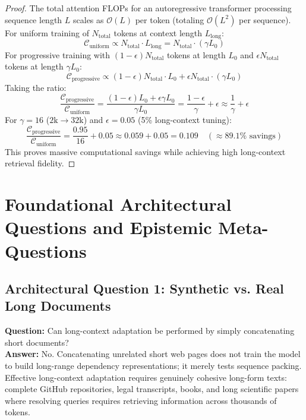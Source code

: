 \documentclass[11pt,a4paper]{article}
\theoremstyle{definition}
\begin{document}
\begin{proof}
The total attention FLOPs for an autoregressive transformer processing sequence length $L$ scales as $\mathcal{O}(L)$ per token (totaling $\mathcal{O}(L^2)$ per sequence).
For uniform training of $N_{\text{total}}$ tokens at context length $L_{\text{long}}$:
{\boldmath
\begin{equation}
\mathcal{C}_{\text{uniform}} \propto N_{\text{total}} \cdot L_{\text{long}} = N_{\text{total}} \cdot (\gamma L_0)
\end{equation}
}
For progressive training with $(1 - \epsilon) N_{\text{total}}$ tokens at length $L_0$ and $\epsilon N_{\text{total}}$ tokens at length $\gamma L_0$:
{\boldmath
\begin{equation}
\mathcal{C}_{\text{progressive}} \propto (1 - \epsilon) N_{\text{total}} \cdot L_0 + \epsilon N_{\text{total}} \cdot (\gamma L_0)
\end{equation}
}
Taking the ratio:
{\boldmath
\begin{equation}
\frac{\mathcal{C}_{\text{progressive}}}{\mathcal{C}_{\text{uniform}}} = \frac{(1 - \epsilon) L_0 + \epsilon \gamma L_0}{\gamma L_0} = \frac{1 - \epsilon}{\gamma} + \epsilon \approx \frac{1}{\gamma} + \epsilon
\end{equation}
}
For $\gamma = 16$ ($2\text{k} \to 32\text{k}$) and $\epsilon = 0.05$ (5\% long-context tuning):
{\boldmath
\begin{equation}
\frac{\mathcal{C}_{\text{progressive}}}{\mathcal{C}_{\text{uniform}}} = \frac{0.95}{16} + 0.05 \approx 0.059 + 0.05 = 0.109 \quad (\approx 89.1\% \text{ savings})
\end{equation}
}
This proves massive computational savings while achieving high long-context retrieval fidelity.
\end{proof}

\section{Foundational Architectural Questions and Epistemic Meta-Questions}

\subsection{Architectural Question 1: Synthetic vs. Real Long Documents}
\textbf{Question:} Can long-context adaptation be performed by simply concatenating short documents?\\
\textbf{Answer:} No. Concatenating unrelated short web pages does not train the model to build long-range dependency representations; it merely tests sequence packing. Effective long-context adaptation requires genuinely cohesive long-form texts: complete GitHub repositories, legal transcripts, books, and long scientific papers where resolving queries requires retrieving information across thousands of tokens.
\end{document}
